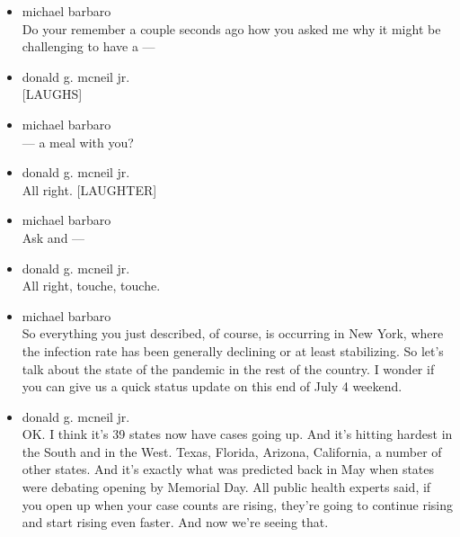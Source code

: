 \begin{itemize}
\item
  michael barbaro\\
  Do your remember a couple seconds ago how you asked me why it might be
  challenging to have a ---
\item
  donald g. mcneil jr.\\
  {[}LAUGHS{]}
\item
  michael barbaro\\
  --- a meal with you?
\item
  donald g. mcneil jr.\\
  All right. {[}LAUGHTER{]}
\item
  michael barbaro\\
  Ask and ---
\item
  donald g. mcneil jr.\\
  All right, touche, touche.
\item
  michael barbaro\\
  So everything you just described, of course, is occurring in New York,
  where the infection rate has been generally declining or at least
  stabilizing. So let's talk about the state of the pandemic in the rest
  of the country. I wonder if you can give us a quick status update on
  this end of July 4 weekend.
\item
  donald g. mcneil jr.\\
  OK. I think it's 39 states now have cases going up. And it's hitting
  hardest in the South and in the West. Texas, Florida, Arizona,
  California, a number of other states. And it's exactly what was
  predicted back in May when states were debating opening by Memorial
  Day. All public health experts said, if you open up when your case
  counts are rising, they're going to continue rising and start rising
  even faster. And now we're seeing that.


\end{itemize}
